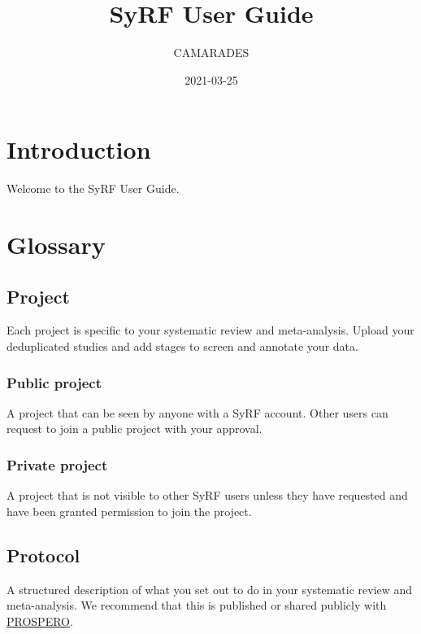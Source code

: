 \documentclass[
]{book}
\title{SyRF User Guide}
\author{CAMARADES}
\date{2021-03-25}
\begin{document}
\maketitle

{
\setcounter{tocdepth}{1}
\tableofcontents
}
\hypertarget{index}{%
\chapter{Introduction}\label{index}}

Welcome to the SyRF User Guide.

\hypertarget{glossary}{%
\chapter{Glossary}\label{glossary}}

\hypertarget{project}{%
\section{Project}\label{project}}

Each project is specific to your systematic review and meta-analysis. Upload your deduplicated studies and add stages to screen and annotate your data.

\hypertarget{public-project}{%
\subsection{Public project}\label{public-project}}

A project that can be seen by anyone with a SyRF account. Other users can request to join a public project with your approval.

\hypertarget{private-project}{%
\subsection{Private project}\label{private-project}}

A project that is not visible to other SyRF users unless they have requested and have been granted permission to join the project.

\hypertarget{protocol}{%
\section{Protocol}\label{protocol}}

A structured description of what you set out to do in your systematic review and meta-analysis. We recommend that this is published or shared publicly with \href{https://www.crd.york.ac.uk/prospero/}{PROSPERO}.
\end{document}
